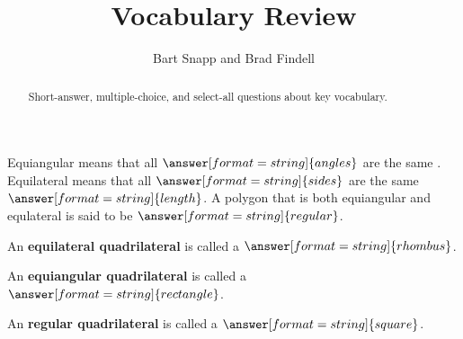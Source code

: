 \documentclass[nooutcomes]{ximera}
\title{Vocabulary Review}
\author{Bart Snapp and Brad Findell}
\begin{document}
\begin{abstract}
Short-answer, multiple-choice, and select-all questions about key vocabulary.
\end{abstract}
\maketitle

%


\begin{question}
Equiangular means that all $\answer[format=string]{angles}$ are the same .  
Equilateral means that all $\answer[format=string]{sides}$ are the same $\answer[format=string]{length}$.  A polygon that is both equiangular and equlateral is said to be $\answer[format=string]{regular}$.  
\end{question}

\begin{question}  
An \textbf{equilateral quadrilateral} is called a $\answer[format=string]{rhombus}$.
\end{question}

\begin{question}  
An \textbf{equiangular quadrilateral} is called a $\answer[format=string]{rectangle}$. 
\end{question}

\begin{question}  
An \textbf{regular quadrilateral} is called a $\answer[format=string]{square}$. 
\end{question}


%
%
\end{document}
